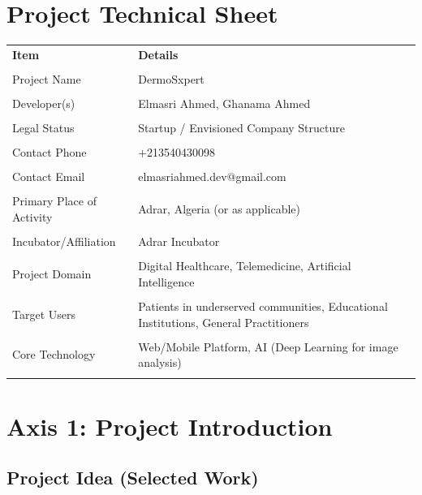 \newpage

\chapter*{Project Technical Sheet}

\begin{tabularx}{\linewidth}{@{} l X @{}}
    \toprule
    \textbf{Item} & \textbf{Details} \\\\
    \midrule
    Project Name & DermoSxpert \\\\
    Developer(s) & Elmasri Ahmed, Ghanama Ahmed \\\\
    Legal Status & Startup / Envisioned Company Structure \\\\
    Contact Phone & +213540430098 \\\\
    Contact Email & elmasriahmed.dev@gmail.com \\\\
    Primary Place of Activity & Adrar, Algeria (or as applicable) \\\\
    Incubator/Affiliation & Adrar Incubator\\\\
    Project Domain & Digital Healthcare, Telemedicine, Artificial Intelligence \\\\
    Target Users & Patients in underserved communities, Educational Institutions, General Practitioners \\\\
    Core Technology & Web/Mobile Platform, AI (Deep Learning for image analysis) \\\\
    \bottomrule
\end{tabularx}

\newpage

\chapter{Axis 1: Project Introduction}

\section{Project Idea (Selected Work)}

